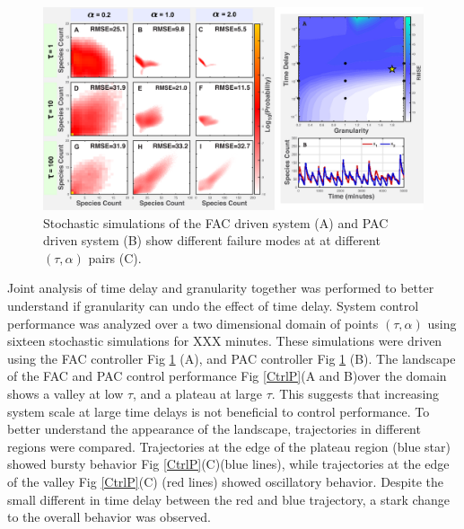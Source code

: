 \documentclass[12pt]{article}
\begin{document}
\begin{figure}
\begin{center}
\includegraphics[width=1\textwidth]{DelayAndGranularity.pdf}
\vspace{-0.1in}
\caption{Stochastic simulations of the FAC driven system (A) and PAC driven system (B) show different failure modes at at different $(\tau,\alpha)$ pairs (C).}
\label{DG}
\end{center}
\vspace{-0.2in}
\end{figure}

Joint analysis of time delay and granularity together was performed to better understand if granularity can undo the effect of time delay. System control performance was analyzed over a two dimensional domain of points $(\tau,\alpha)$ using sixteen stochastic simulations for XXX minutes. These simulations were driven using the FAC controller Fig \ref{DG} (A), and PAC controller Fig \ref{DG} (B). The landscape of the FAC and PAC control performance Fig \ref {CtrlP}(A and B)over the domain shows a valley at low $\tau$, and a plateau at large $\tau$. This suggests that increasing system scale at large time delays is not beneficial to control performance. To better understand the appearance of the landscape, trajectories in different regions were compared. Trajectories at the edge of the plateau region (blue star) showed bursty behavior Fig \ref {CtrlP}(C)(blue lines), while trajectories at the edge of the valley Fig \ref {CtrlP}(C) (red lines) showed oscillatory behavior. Despite the small different in time delay between the red and blue trajectory, a stark change to the overall behavior was observed.
\end{document}
